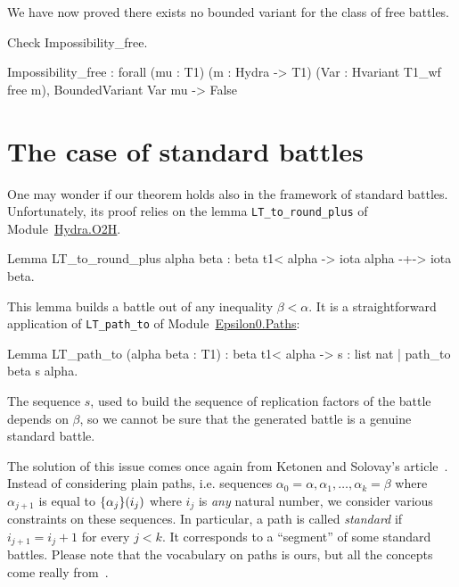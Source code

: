 We have now proved there exists no bounded variant for the class of free battles.

 
\begin{Coqsrc}
Check Impossibility_free.
\end{Coqsrc}

\begin{Coqanswer}
Impossibility_free
     : forall (mu : T1) (m : Hydra -> T1) (Var : Hvariant T1_wf free m),
       BoundedVariant Var mu -> False
\end{Coqanswer}
  



\section{The case of standard battles}
\label{sec:standard-intro}\label{std-case}
One may wonder if our theorem holds also in the framework of standard battles. Unfortunately, its proof relies on the lemma \texttt{LT\_to\_round\_plus} of
Module~\href{../theories/html/hydras.Hydra.O2H.html}{Hydra.O2H}.

\begin{Coqsrc}
Lemma LT_to_round_plus alpha beta :
    beta t1< alpha ->  iota alpha -+-> iota beta.
\end{Coqsrc}

This lemma builds a battle out of any inequality $\beta<\alpha$. 
It is a straightforward application of \texttt{LT\_path\_to} of
Module~\href{../theories/html/hydras.Epsilon0.Paths.html}{Epsilon0.Paths}:

\begin{Coqsrc}
Lemma LT_path_to (alpha beta : T1) :
  beta t1< alpha -> {s : list nat | path_to beta s alpha}.
\end{Coqsrc}

The sequence $s$, used to build the sequence of replication factors of the battle depends on 
$\beta$, so we cannot be sure that the generated battle is a genuine standard battle.


The solution of this issue comes  once again from Ketonen and Solovay's article~\cite{KS81}. Instead of considering plain paths, i.e. sequences 
$\alpha_0=\alpha,\alpha_1,\dots,\alpha_k=\beta$ where $\alpha_{j+1}$ is equal
to $\mbox{$\{\alpha_j\}(i_j)$}$ where $i_j$ is \emph{any} natural number, 
we consider various constraints on these sequences.
In particular, a path is called \emph{standard} if $i_{j+1} = i_j + 1$ for every $j<k$.
It  corresponds to a ``segment'' of some standard battles. 
Please note that the vocabulary on paths is ours, but all the concepts come really from~\cite{KS81}.

